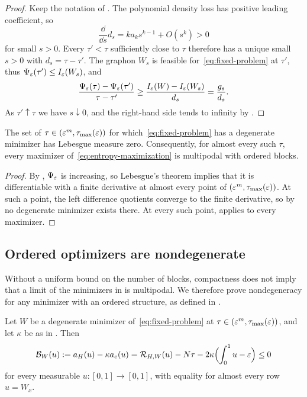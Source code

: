 \begin{proof}
Keep the notation of .  The polynomial
density loss has positive leading coefficient, so
\[
  \frac{\dd}{\dd s}d_s=ka_k s^{k-1}+O(s^k)>0
\]
for small $s>0$.  Every $\tau'<\tau$ sufficiently close to $\tau$
therefore has a unique small $s>0$ with $d_s=\tau-\tau'$.
The graphon $W_s$ is feasible for~\eqref{eq:fixed-problem} at $\tau'$,
thus $\Psi_\varepsilon(\tau')\le I_\varepsilon(W_s)$, and
\[
  \frac{\Psi_\varepsilon(\tau)-\Psi_\varepsilon(\tau')}{\tau-\tau'}
  \ge\frac{I_\varepsilon(W)-I_\varepsilon(W_s)}{d_s}
  =\frac{g_s}{d_s}.
\]
As $\tau'\uparrow\tau$ we have $s\downarrow0$, and the right-hand side
tends to infinity by .
\end{proof}

\begin{cor}\label{cor:almost-every-tau}
The set of $\tau\in(\varepsilon^m,\tau_{\max}(\varepsilon))$ for
which~\eqref{eq:fixed-problem} has a degenerate minimizer has Lebesgue measure
zero.  Consequently, for almost every such $\tau$, every maximizer
of~\eqref{eq:entropy-maximization} is multipodal with ordered blocks.
\end{cor}

\begin{proof}
By , $\Psi_\varepsilon$ is increasing, so Lebesgue's
theorem implies that it is
differentiable with a finite derivative at almost every point of
$(\varepsilon^m,\tau_{\max}(\varepsilon))$.
At such a point, the left difference
quotients converge to the finite derivative, so by
 no degenerate minimizer exists there.
At every such point,  applies to every maximizer.
\end{proof}

\subsection{Ordered optimizers are nondegenerate}\label{sec:ordered-nondegeneracy}

Without a uniform bound on the number of blocks, compactness does not
imply that a limit of the minimizers in  is
multipodal. We therefore prove nondegeneracy for any minimizer with
an ordered structure, as defined in .

\begin{lemma}\label{lem:degenerate-insertion}
Let $W$ be a degenerate minimizer of~\eqref{eq:fixed-problem} at
$\tau\in(\varepsilon^m,\tau_{\max}(\varepsilon))$, and let $\kappa$ be as in
.  Then
\begin{equation}\label{eq:degenerate-insertion}
  \mathcal B_W(u)
  :=a_H(u)-\kappa a_e(u)
  =\mathcal R_{H,W}(u)-N\tau-2\kappa\Bigl(\int_0^1u-\varepsilon\Bigr)\le0
\end{equation}
for every measurable $u:[0,1]\to[0,1]$, with equality for almost every row
$u=W_x$.
\end{lemma}

